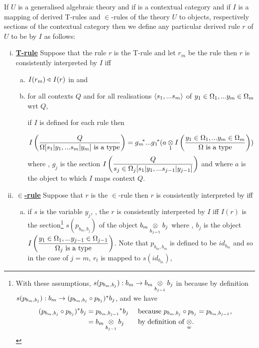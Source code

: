\begin{definition}
If $U$ is a generalised algebraic theory and if \catcw is a contextual category 
and if $I$ is a  mapping of derived T-rules and $\in$-rules of the theory $U$ to objects, respectively sections of the contextual category \catcw
then we define any particular derived rule $r$ of $U$ to be  by $I$ as follows: \\
\begin{enumerate}[(i)]
\item \underline{\textbf{T-rule}} 
Suppose that  the rule $r$ is the T-rule \ZOmega and let $r_m$ be the rule
then $r$ is consistently interpreted by $I$ iff
\begin{enumerate}[(a)] 
\item {} $I(r_m) \base\, I(r)$ in \catcw  and
\item
for all contexts $Q$ and for all realisations $\tuple{\sm}$ of $\yOmega{m}$ wrt $Q$, 
\begin{newtt}
if $I$ is defined for each rule  then
\end{newtt}
$$ \Imappedrule{Q}{\isT{\Omega[\SUBsmFORym]}} = \gmstar...\gonestar(\crossx{a}{\Imappedrule{\yOmega{m}}{\isT{\Omega}}}{1})$$
where \foreachj, $g_j$ is the section
$\displaystyle\Imappedrule{Q}{\sjconclusion}$ and where $a$ is the object to which $I$ maps context $Q$. 
\end {enumerate}

\item \underline{\textbf{$\boldsymbol {\in}$-rule}} 
Suppose that $r$ is the $\in$-rule \ZsOmega then
$r$ is consistently interpreted by iff
\begin{enumerate}[(a)]
\item if $s$ is the variable $y_j$, \forsomej, the $r$ is consistently interpreted
by $I$ iff $I(r)$ is the section\footnote{
With these assumptions, $s(p_{b_m,b_j}): b_m \morph \crossx{b_m}{b_j}{b_{j-1}}$ in \catcw because by definition  $s(p_{b_m,b_j}): b_m  \morph (p_{b_m,b_j} \circ p_{b_j})^*b_j$,
and we have 
\begin{align*}
(p_{b_m,b_j} \circ p_{b_j})^*b_j &= {p_{b_m,b_{j-1}}} ^* b_j  && \mbox{ because $p_{b_m,b_j} \circ p_{b_j}=p_{b_m,b_{j-1}}$,} \\
                                 &= \crossx{b_m}{b_j}{b_{j-1}} && \mbox{ by definition of $\crossx{}{}{w}$}.
\end{align*}
} %
$s(p_{b_m,b_j})$ of the object $\crossx{b_m}{b_j}{b_{j-1}}$ where \foreachj, $b_j$ is the object
$\displaystyle\Imappedrule{\yOmega{j-1}}{\isT{\Omega_j}}$.  
Note that $p_{b_m,b_m}$ is defined to be $id_{b_m}$ and so in the case of $j=m$, $r_t$
is mapped to   $s(id_{b_m})$,


\end{enumerate}
\end{enumerate}
\end{definition}
